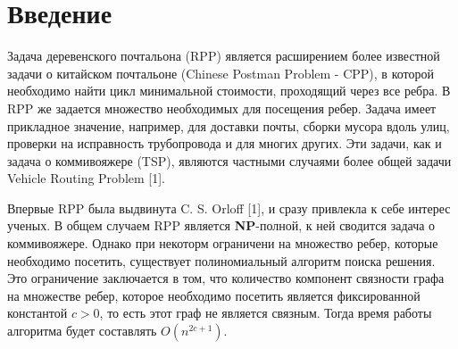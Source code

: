 \section{Введение}
    Задача деревенского почтальона (\textsf{RPP}) является расширением более известной задачи о китайском почтальоне (\textsf{Chinese Postman Problem - CPP}), в которой необходимо найти цикл минимальной стоимости, проходящий через все ребра. В \textsf{RPP} же задается множество необходимых для посещения ребер. Задача имеет прикладное значение, например, для доставки почты, сборки мусора вдоль улиц, проверки на исправность трубопровода и для многих других. Эти задачи, как и задача о коммивояжере (\textsf{TSP}), являются частными случаями более общей задачи \textsf{Vehicle Routing Problem} [1]. 
    
    Впервые \textsf{RPP} была выдвинута C. S. Orloff [1], и сразу привлекла к себе интерес ученых.
    В общем случаем \textsf{RPP} является \textbf{NP}-полной, к ней сводится задача о коммивояжере.
    Однако при некоторм ограничени на множество ребер, которые необходимо посетить, существует полиномиальный алгоритм поиска решения. Это ограничение заключается в том, что количество компонент связности графа на множестве ребер, которое необходимо посетить является фиксированной константой $c > 0$, то есть этот граф не является связным. Тогда время работы алгоритма будет составлять  $O(n^{2c+1})$. 